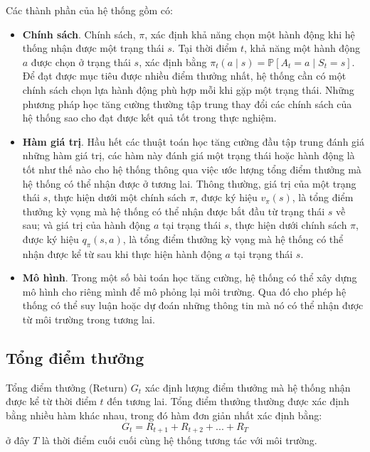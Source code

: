 Các thành phần của hệ thống gồm có:
\begin{itemize}
	\item \textbf{Chính sách}. Chính sách, $\pi$, xác định khả năng chọn một hành động khi hệ thống nhận được một trạng thái $s$. Tại thời điểm $t$, khả năng một hành động $a$ được chọn ở trạng thái $s$, xác định bằng $\pi_t(a \mid s) = \mathbb{P}[\mathit{A_t} = a \mid \mathit{S_t} = s]$. Để đạt được mục tiêu được nhiều điểm thưởng nhất, hệ thống cần có một chính sách chọn lựa hành động phù hợp mỗi khi gặp một trạng thái. Những phương pháp học tăng cường thường tập trung thay đổi các chính sách của hệ thống sao cho đạt được kết quả tốt trong thực nghiệm.
	\item \textbf{Hàm giá trị}. Hầu hết các thuật toán học tăng cường đầu tập trung đánh giá những hàm giá trị, các hàm này đánh giá một trạng thái hoặc hành động là tốt như thế nào cho hệ thống thông qua việc ước lượng tổng điểm thưởng mà hệ thống có thể nhận được ở tương lai. Thông thường, giá trị của một trạng thái $s$, thực hiện dưới một chính sách $\pi$, được ký hiệu $v_{\pi}(s)$, là tổng điểm thưởng kỳ vọng mà hệ thống có thể nhận được bắt đầu từ trạng thái $s$ về sau; và giá trị của hành động $a$ tại trạng thái $s$, thực hiện dưới chính sách $\pi$, được ký hiệu $q_{\pi}(s,a)$, là tổng điểm thưởng kỳ vọng mà hệ thống có thể nhận được kể từ sau khi thực hiện hành động $a$ tại trạng thái $s$. 
	\item \textbf{Mô hình}. Trong một số bài toán học tăng cường, hệ thống có thể xây dựng mô hình cho riêng mình để mô phỏng lại môi trường. Qua đó cho phép hệ thống có thể suy luận hoặc dự đoán những thông tin mà nó có thể nhận được từ môi trường trong tương lai.
\end{itemize}	

\subsection{Tổng điểm thưởng}
Tổng điểm thưởng (Return) $\mathit{G_t}$ xác định lượng điểm thưởng mà hệ thống nhận được kể từ thời điểm $t$ đến tương lai. Tổng điểm thưởng thường được xác định bằng nhiều hàm khác nhau, trong đó hàm đơn giản nhất xác định bằng:
\begin{equation}
\mathit{G_t} = \mathit{R_{t+1}} + \mathit{R_{t+2}} + ... + \mathit{R_{T}}
\end{equation}	
ở đây $T$ là thời điểm cuối cuối cùng hệ thống tương tác với môi trường.

